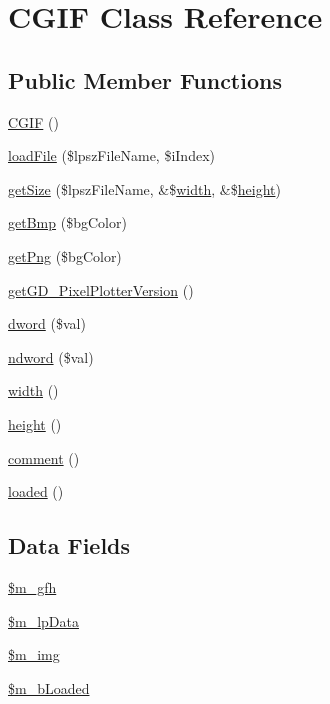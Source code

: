 \hypertarget{class_c_g_i_f}{\section{\-C\-G\-I\-F \-Class \-Reference}
\label{class_c_g_i_f}
}
\subsection*{\-Public \-Member \-Functions}
\begin{DoxyCompactItemize}
\item 
\hyperlink{class_c_g_i_f_a021ab7447924f120fac4475a92df7355}{\-C\-G\-I\-F} ()
\item 
\hyperlink{class_c_g_i_f_af49a5d329b04beb748ceef8e28cab33b}{load\-File} (\$lpsz\-File\-Name, \$i\-Index)
\item 
\hyperlink{class_c_g_i_f_a660f1e4a575e8acb8b6b485603c8588a}{get\-Size} (\$lpsz\-File\-Name, \&\$\hyperlink{class_c_g_i_f_aac6ce1a0981556eb27334db76b666350}{width}, \&\$\hyperlink{class_c_g_i_f_a40c074d7d21447265a9ce46470c94414}{height})
\item 
\hyperlink{class_c_g_i_f_ac97432cbd5ba80c9ab6b31e01e2cdefc}{get\-Bmp} (\$bg\-Color)
\item 
\hyperlink{class_c_g_i_f_a7c3caf0be8b7a53353592ef0565fbf49}{get\-Png} (\$bg\-Color)
\item 
\hyperlink{class_c_g_i_f_a806b7d3553b0425b447862f51eb29844}{get\-G\-D\-\_\-\-Pixel\-Plotter\-Version} ()
\item 
\hyperlink{class_c_g_i_f_accd8e199172d468f7aba09e3fb54a7c9}{dword} (\$val)
\item 
\hyperlink{class_c_g_i_f_a0a875e169eb1a9ae2e92eedb6a8aaffa}{ndword} (\$val)
\item 
\hyperlink{class_c_g_i_f_aac6ce1a0981556eb27334db76b666350}{width} ()
\item 
\hyperlink{class_c_g_i_f_a40c074d7d21447265a9ce46470c94414}{height} ()
\item 
\hyperlink{class_c_g_i_f_ae2095edae4e260d028c208cead4e5c9a}{comment} ()
\item 
\hyperlink{class_c_g_i_f_a3f07a4aa73e71d525744db933bc2aff4}{loaded} ()
\end{DoxyCompactItemize}
\subsection*{\-Data \-Fields}
\begin{DoxyCompactItemize}
\item 
\hyperlink{class_c_g_i_f_a3ec9769e9e8427e34ba0e799acb3382c}{\$m\-\_\-gfh}
\item 
\hyperlink{class_c_g_i_f_a6ff7a0a783503784071f70f8c094a261}{\$m\-\_\-lp\-Data}
\item 
\hyperlink{class_c_g_i_f_a3128bc33c0f5fbf0944deba2e25aeade}{\$m\-\_\-img}
\item 
\hyperlink{class_c_g_i_f_a6b4d0a2f0b091a97721f9fb4d14a4005}{\$m\-\_\-b\-Loaded}
\end{DoxyCompactItemize}



